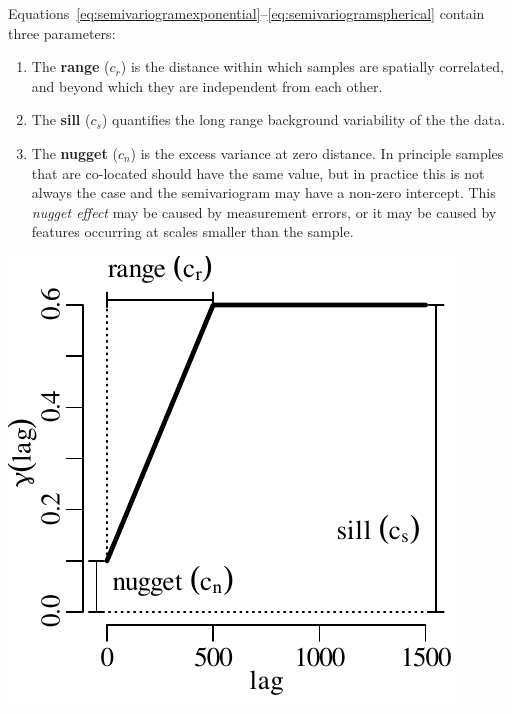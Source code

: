 Equations~\ref{eq:semivariogramexponential}--\ref{eq:semivariogramspherical}
contain three parameters:

\begin{enumerate}
\item The \textbf{range} ($c_r$) is the distance within which samples
  are spatially correlated, and beyond which they are independent from
  each other.

\item The \textbf{sill} ($c_s$) quantifies the long range background
  variability of the the data.\\

\item The \textbf{nugget} ($c_n$) is the excess variance at zero
  distance. In principle samples that are co-located should have the
  same value, but in practice this is not always the case and the
  semivariogram may have a non-zero intercept. This \textit{nugget
    effect} may be caused by measurement errors, or it may be caused
  by features occurring at scales smaller than the sample.
\end{enumerate}

\noindent\begin{minipage}[t][][b]{.35\textwidth}
\includegraphics[width=\textwidth]{../figures/snr.pdf}
\end{minipage}
\begin{minipage}[t][][t]{.65\textwidth}
  \label{fig:snr}
\end{minipage}

